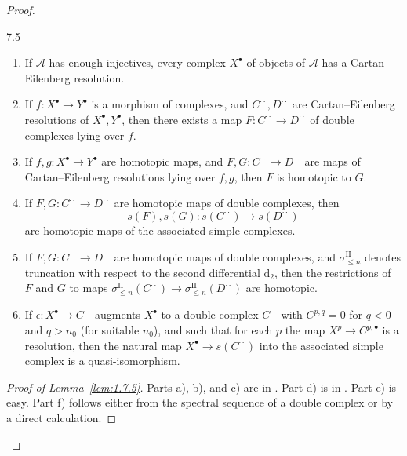\begin{proof}
\begin{booklemma}{7.5}\label{lem:1.7.5}
\leavevmode
\begin{enumerate}
\item[a)] If $\mathcal{A}$ has enough injectives, every complex $X^\bullet$ of objects of $\mathcal{A}$ has a Cartan--Eilenberg resolution.
\item[b)] If $f\colon X^\bullet\to Y^\bullet$ is a morphism of complexes, and $C^{\cdot\cdot},D^{\cdot\cdot}$ are Cartan--Eilenberg resolutions of $X^\bullet,Y^\bullet$, then there exists a map $F\colon C^{\cdot\cdot}\to D^{\cdot\cdot}$ of double complexes lying over $f$.
\item[c)] If $f,g\colon X^\bullet\to Y^\bullet$ are homotopic maps, and $F,G\colon C^{\cdot\cdot}\to D^{\cdot\cdot}$ are maps of Cartan--Eilenberg resolutions lying over $f,g$, then $F$ is homotopic to $G$.
\item[d)] If $F,G\colon C^{\cdot\cdot}\to D^{\cdot\cdot}$ are homotopic maps of double complexes, then
\[
s(F),s(G)\colon s(C^{\cdot\cdot})\to s(D^{\cdot\cdot})
\]
are homotopic maps of the associated simple complexes.
\item[e)] \begingroup\setlength{\emergencystretch}{2em} If $F,G\colon C^{\cdot\cdot}\to D^{\cdot\cdot}$ are homotopic maps of double complexes, and $\sigma^{\mathrm{II}}_{\le n}$ denotes truncation with respect to the second differential $\mathrm{d}_2$, then the restrictions of $F$ and $G$ to maps $\sigma^{\mathrm{II}}_{\le n}(C^{\cdot\cdot})\to\sigma^{\mathrm{II}}_{\le n}(D^{\cdot\cdot})$ are homotopic.\par\endgroup
\item[f)] If $\epsilon\colon X^\bullet\to C^{\cdot\cdot}$ augments $X^\bullet$ to a double complex $C^{\cdot\cdot}$ with $C^{p,q}=0$ for $q<0$ and $q>n_0$ (for suitable $n_0$), and such that for each $p$ the map $X^p\to C^{p,\bullet}$ is a resolution, then the natural map $X^\bullet\to s(C^{\cdot\cdot})$ into the associated simple complex is a quasi-isomorphism.
\end{enumerate}
\end{booklemma}

\begin{proof}[Proof of Lemma~\ref{lem:1.7.5}]
Parts a), b), and c) are in \cite[\nopp Ch.~XVII, Prop.~1.2]{M}. Part d) is in \cite[\nopp Ch.~IV, \S4]{M}. Part e) is easy. Part f) follows either from the spectral sequence of a double complex \cite[\nopp $0_{\mathrm{III}}$, 11.3.3(ii)]{EGA} or by a direct calculation.
\end{proof}


\end{proof}
